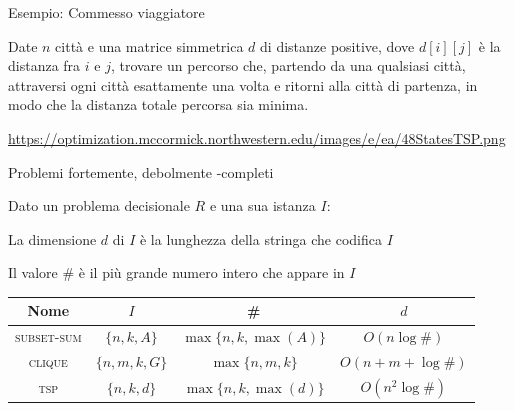 \begin{frame}{Esempio: Commesso viaggiatore}

\vspace{-9pt}
\begin{myboxtitle}
Date $n$ città e una matrice simmetrica $d$ di distanze positive, dove $d[i][j]$ è la distanza fra $i$ e $j$, trovare un percorso
che, partendo da una qualsiasi città, attraversi ogni città esattamente una
volta e ritorni alla città di partenza, in modo che la distanza totale
percorsa sia minima.
\end{myboxtitle}

\begin{center}
\end{center}

\vfill
\tiny
\url{https://optimization.mccormick.northwestern.edu/images/e/ea/48StatesTSP.png}


\end{frame}

\begin{frame}{Problemi fortemente, debolmente \NP-completi}

\vspace{-9pt}
\begin{myboxtitle}
Dato un problema decisionale $R$ e una sua istanza $I$:
\BIL
\item La \alert{dimensione $d$} di $I$ è la lunghezza della stringa che codifica $I$
\item Il \alert{valore \#} è il più grande numero intero che appare in $I$
\EIL
\end{myboxtitle}

\begin{myboxtitle}[Esempi]
\small
\begin{tabular}{|c|c|c|c|}
\hline
\textbf{Nome} & $I$ & \# & $d$ \\\hline
\textsc{subset-sum} & $ \{n, k, A\}$ & $\max\{n, k, \max(A)\}$ & $O(n \log \#)$ \\\hline
\textsc{clique} & $\{n, m, k, G \}$ & $\max\{n, m, k\}$ & $O(n + m + \log\#)$\\\hline
\textsc{tsp} & $\{n, k, d \}$ & $\max\{n, k, \max(d)\}$ &
$O(n^2 \log \#)$ \\\hline
\end{tabular}
\end{myboxtitle}

\end{frame}


